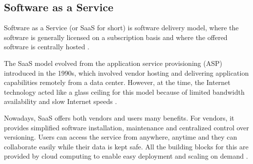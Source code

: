 
\subsection{Software as a Service}

Software as a Service (or SaaS for short) is software delivery model, where the software is generally licensed on a subscription basis and where the offered software is centrally hosted \cite{SaaSWikipedia}.

The SaaS model evolved from the application service provisioning (ASP) introduced in the 1990s, which involved vendor hosting and delivering application capabilities remotely from a data center. However, at the time, the Internet technology acted like a glass ceiling for this model because of limited bandwidth availability and slow Internet speeds \cite{SaaSOppRisk}.

Nowadays, SaaS offers both vendors and users many benefits. For vendors, it provides simplified software installation, maintenance and centralized control over versioning. Users can access the service from anywhere, anytime and they can collaborate easily while their data is kept safe. All the building blocks for this are provided by cloud computing to enable easy deployment and scaling on demand \cite{AboveTheClouds}.

